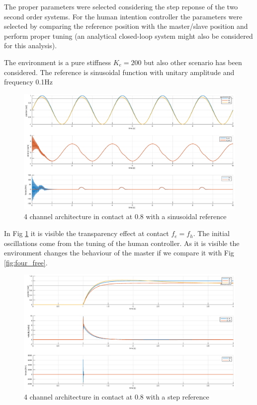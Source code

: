 \documentclass[a4paper,12pt]{article}
\begin{document}
\bigskip
\noindent The proper parameters were selected considering the step reponse of the two second order systems. For the human intention controller the parameters were selected by comparing the reference position with the master/slave position and perform proper tuning (an analytical closed-loop system might also be considered for this analysis).

\bigskip
The environment is a pure stiffness $K_e = 200$ but also other scenario has been considered. The reference is sinusoidal function with unitary amplitude and frequency 0.1Hz

\begin{figure}[H]
    \begin{center}
        \hspace*{-4.4cm}
        \includegraphics[scale=0.5]{images/four_contact_05.eps}
    \end{center}
    \caption{4 channel architecture in contact at 0.8 with a sinusoidal reference}
    \label{fig:four_cotact}
\end{figure}

In Fig \ref{fig:four_cotact} it is visible the transparency effect at contact $f_e=f_h$. The initial oscillations come from the tuning of the human controller. As it is visible the environment changes the behaviour of the master if we compare it with Fig \ref{fig:four_free}.

\begin{figure}[H]
    \begin{center}
        \hspace*{-4.4cm}
        \includegraphics[scale=0.5]{images/four_step_contact_05.eps}
    \end{center}
    \caption{4 channel architecture in contact at 0.8 with a step reference}
    \label{fig:four_step}
\end{figure}
\end{document}
